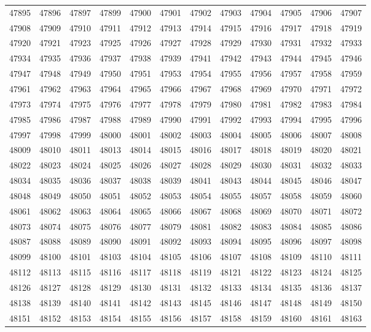 \begin{center}
\begin{longtable}{llllllllllll}
47895 &47896 &47897 &47899 &47900 &47901 &47902 &47903 &47904 &47905 &47906 &47907 \\
47908 &47909 &47910 &47911 &47912 &47913 &47914 &47915 &47916 &47917 &47918 &47919 \\
47920 &47921 &47923 &47925 &47926 &47927 &47928 &47929 &47930 &47931 &47932 &47933 \\
47934 &47935 &47936 &47937 &47938 &47939 &47941 &47942 &47943 &47944 &47945 &47946 \\
47947 &47948 &47949 &47950 &47951 &47953 &47954 &47955 &47956 &47957 &47958 &47959 \\
47961 &47962 &47963 &47964 &47965 &47966 &47967 &47968 &47969 &47970 &47971 &47972 \\
47973 &47974 &47975 &47976 &47977 &47978 &47979 &47980 &47981 &47982 &47983 &47984 \\
47985 &47986 &47987 &47988 &47989 &47990 &47991 &47992 &47993 &47994 &47995 &47996 \\
47997 &47998 &47999 &48000 &48001 &48002 &48003 &48004 &48005 &48006 &48007 &48008 \\
48009 &48010 &48011 &48013 &48014 &48015 &48016 &48017 &48018 &48019 &48020 &48021 \\
48022 &48023 &48024 &48025 &48026 &48027 &48028 &48029 &48030 &48031 &48032 &48033 \\
48034 &48035 &48036 &48037 &48038 &48039 &48041 &48043 &48044 &48045 &48046 &48047 \\
48048 &48049 &48050 &48051 &48052 &48053 &48054 &48055 &48057 &48058 &48059 &48060 \\
48061 &48062 &48063 &48064 &48065 &48066 &48067 &48068 &48069 &48070 &48071 &48072 \\
48073 &48074 &48075 &48076 &48077 &48079 &48081 &48082 &48083 &48084 &48085 &48086 \\
48087 &48088 &48089 &48090 &48091 &48092 &48093 &48094 &48095 &48096 &48097 &48098 \\
48099 &48100 &48101 &48103 &48104 &48105 &48106 &48107 &48108 &48109 &48110 &48111 \\
48112 &48113 &48115 &48116 &48117 &48118 &48119 &48121 &48122 &48123 &48124 &48125 \\
48126 &48127 &48128 &48129 &48130 &48131 &48132 &48133 &48134 &48135 &48136 &48137 \\
48138 &48139 &48140 &48141 &48142 &48143 &48145 &48146 &48147 &48148 &48149 &48150 \\
48151 &48152 &48153 &48154 &48155 &48156 &48157 &48158 &48159 &48160 &48161 &48163 \\

\end{longtable}
\end{center}
